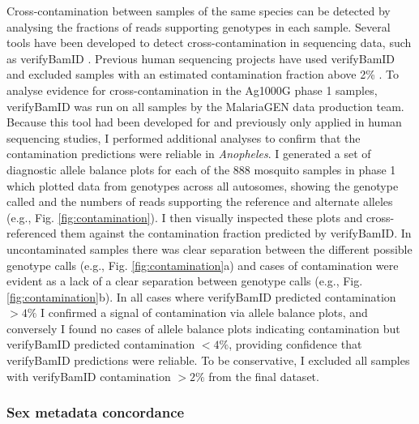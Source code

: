 \documentclass[a4paper,11pt,abstracton,hidelinks]{scrartcl}
\begin{document}
Cross-contamination between samples of the same species can be detected by analysing the fractions of reads supporting genotypes in each sample.
%
Several tools have been developed to detect cross-contamination in sequencing data, such as verifyBamID \citep{Jun2012}.
%
Previous human sequencing projects have used verifyBamID and excluded samples with an estimated contamination fraction above 2\% \citep{1000G2015}.
%
To analyse evidence for cross-contamination in the Ag1000G phase 1 samples, verifyBamID was run on all samples by the MalariaGEN data production team.
%
Because this tool had been developed for and previously only applied in human sequencing studies, I performed additional analyses to confirm that the contamination predictions were reliable in \textit{Anopheles}.
%
I generated a set of diagnostic allele balance plots for each of the 888 mosquito samples in phase 1 which plotted data from genotypes across all autosomes, showing the genotype called and the numbers of reads supporting the reference and alternate alleles (e.g., Fig. \ref{fig:contamination}). 
%
I then visually inspected these plots and cross-referenced them against the contamination fraction predicted by verifyBamID.
%
In uncontaminated samples there was clear separation between the different possible genotype calls (e.g., Fig. \ref{fig:contamination}a) and cases of contamination were evident as a lack of a clear separation between genotype calls (e.g., Fig. \ref{fig:contamination}b).
%
In all cases where verifyBamID predicted contamination $>4\%$ I confirmed a signal of contamination via allele balance plots, and conversely I found no cases of allele balance plots indicating contamination but verifyBamID predicted contamination $<4\%$, providing confidence that verifyBamID predictions were reliable. 
%
To be conservative, I excluded all samples with verifyBamID contamination $>2\%$ from the final dataset.
%


\subsubsection{Sex metadata concordance}
\end{document}
